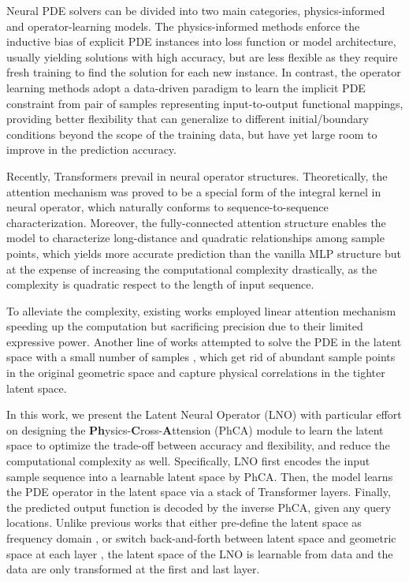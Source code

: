 \documentclass{article}
\begin{document}
Neural PDE solvers can be divided into two main categories, physics-informed and operator-learning models. The physics-informed methods\cite{PIML,PINN,FINN,DeepGreen,PeRCNN,PINN_DeepONet} enforce the inductive bias of explicit PDE instances into loss function or model architecture, usually yielding solutions with high accuracy, but are less flexible as they require fresh training to find the solution for each new instance. 
%
In contrast, the operator learning methods\cite{ChenChenTheroem,DeepONet,FNO,NO} adopt a data-driven paradigm to learn the implicit PDE constraint from pair of samples representing input-to-output functional mappings, providing better flexibility that can generalize to different initial/boundary conditions beyond the scope of the training data, but have yet large room to improve in the prediction accuracy.

Recently, Transformers\cite{Attention} prevail in neural operator structures. Theoretically, the attention mechanism was proved to be a special form of the integral kernel\cite{NO,LOCA} in neural operator, which naturally conforms to sequence-to-sequence characterization. Moreover, the fully-connected attention structure enables the model to characterize long-distance and quadratic relationships among sample points, which yields more accurate prediction than the vanilla MLP structure\cite{DeepONet} but at the expense of increasing the computational complexity drastically, as the complexity is quadratic respect to the length of input sequence.

To alleviate the complexity, existing works employed linear attention mechanism \cite{EA,NA,GalerkinTransformer,GNOT} speeding up the computation but sacrificing precision due to their limited expressive power. Another line of works attempted to solve the PDE in the latent space with a small number of samples \cite{LSM,Transolver,UPT,LST,LA}, which get rid of abundant sample points in the original geometric space and capture physical correlations in the tighter latent space.

In this work, we present the Latent Neural Operator (LNO) with particular effort on designing the \textbf{Ph}ysics-\textbf{C}ross-\textbf{A}ttension (PhCA) module to learn the latent space to optimize the trade-off between accuracy and flexibility, and reduce the computational complexity as well. 
Specifically, LNO first encodes the input sample sequence into a learnable latent space by PhCA. Then, the model learns the PDE operator in the latent space via a stack of Transformer layers. Finally, the predicted output function is decoded by the inverse PhCA, given any query locations. 
%
Unlike previous works that either pre-define the latent space as frequency domain \cite{FNO}, or switch back-and-forth between latent space and geometric space at each layer \cite{Transolver}, the latent space of the LNO is learnable from data and the data are only transformed at the first and last layer. 
\end{document}
